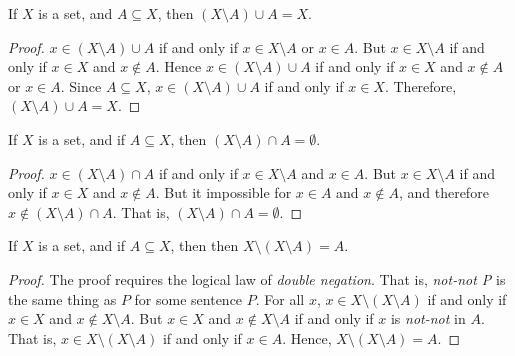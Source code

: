             \begin{theorem}
                If $X$ is a set, and $A\subseteq{X}$, then
                $(X\setminus{A})\cup{A}=X$.
            \end{theorem}
            \begin{proof}
                $x\in(X\setminus{A})\cup{A}$ if and only if
                $x\in{X}\setminus{A}$ or $x\in{A}$. But $x\in{X}\setminus{A}$
                if and only if $x\in{X}$ and $x\notin{A}$. Hence
                $x\in(X\setminus{A})\cup{A}$ if and only if
                $x\in{X}$ and $x\notin{A}$ or $x\in{A}$. Since $A\subseteq{X}$,
                $x\in(X\setminus{A})\cup{A}$ if and only if $x\in{X}$.
                Therefore, $(X\setminus{A})\cup{A}=X$.
            \end{proof}
            \begin{theorem}
                If $X$ is a set, and if $A\subseteq{X}$, then
                $(X\setminus{A})\cap{A}=\emptyset$.
            \end{theorem}
            \begin{proof}
                $x\in(X\setminus{A})\cap{A}$ if and only if
                $x\in{X}\setminus{A}$ and $x\in{A}$. But
                $x\in{X}\setminus{A}$ if and only if $x\in{X}$ and
                $x\notin{A}$. But it impossible for $x\in{A}$ and
                $x\notin{A}$, and therefore $x\notin(X\setminus{A})\cap{A}$.
                That is, $(X\setminus{A})\cap{A}=\emptyset$.
            \end{proof}
            \begin{theorem}
                If $X$ is a set, and if $A\subseteq{X}$, then
                then $X\setminus(X\setminus{A})=A$.
            \end{theorem}
            \begin{proof}
                The proof requires the logical law of
                \textit{double negation}. That is, \textit{not-not P} is
                the same thing as $P$ for some sentence $P$. For all $x$,
                $x\in{X}\setminus(X\setminus{A})$ if and only if
                $x\in{X}$ and $x\notin{X}\setminus{A}$. But
                $x\in{X}$ and $x\notin{X}\setminus{A}$ if and only if
                $x$ is \textit{not-not} in $A$. That is,
                $x\in{X}\setminus(X\setminus{A})$ if and only if $x\in{A}$.
                Hence, $X\setminus(X\setminus{A})=A$.
            \end{proof}
